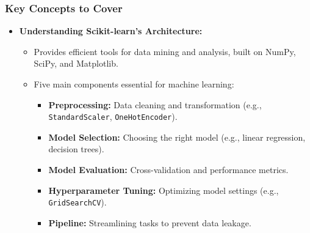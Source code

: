 \documentclass[aspectratio=169]{beamer}
\begin{document}
\begin{frame}
    \frametitle{Key Concepts to Cover}
    \begin{itemize}
        \item \textbf{Understanding Scikit-learn's Architecture:}
        \begin{itemize}
            \item Provides efficient tools for data mining and analysis, built on NumPy, SciPy, and Matplotlib.
            \item Five main components essential for machine learning:
            \begin{itemize}
                \item \textbf{Preprocessing:} Data cleaning and transformation (e.g., \texttt{StandardScaler}, \texttt{OneHotEncoder}).
                \item \textbf{Model Selection:} Choosing the right model (e.g., linear regression, decision trees).
                \item \textbf{Model Evaluation:} Cross-validation and performance metrics.
                \item \textbf{Hyperparameter Tuning:} Optimizing model settings (e.g., \texttt{GridSearchCV}).
                \item \textbf{Pipeline:} Streamlining tasks to prevent data leakage.
            \end{itemize}
        \end{itemize}
    \end{itemize}
\end{frame}
\end{document}
